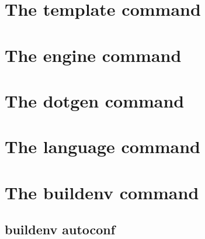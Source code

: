 %
%
%
%
%
\section{The template command}


\section{The engine command}


\section{The dotgen command}


\section{The language command}


\section{The buildenv command}
\subsection{buildenv autoconf}

